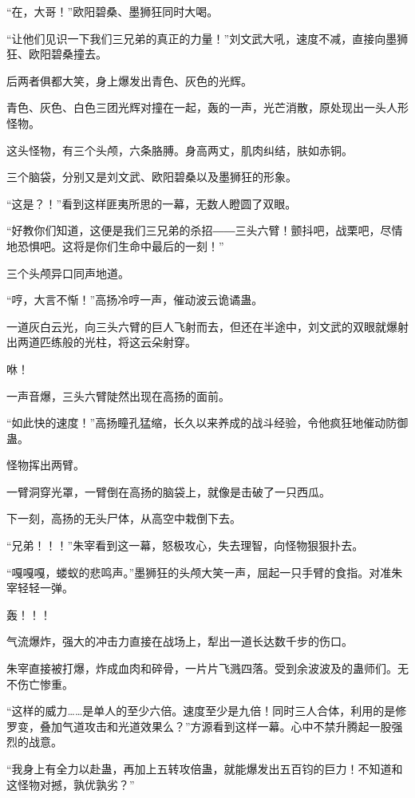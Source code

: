 
\begin{this_body}

“在，大哥！”欧阳碧桑、墨狮狂同时大喝。

“让他们见识一下我们三兄弟的真正的力量！”刘文武大吼，速度不减，直接向墨狮狂、欧阳碧桑撞去。

后两者俱都大笑，身上爆发出青色、灰色的光辉。

青色、灰色、白色三团光辉对撞在一起，轰的一声，光芒消散，原处现出一头人形怪物。

这头怪物，有三个头颅，六条胳膊。身高两丈，肌肉纠结，肤如赤铜。

三个脑袋，分别又是刘文武、欧阳碧桑以及墨狮狂的形象。

“这是？！”看到这样匪夷所思的一幕，无数人瞪圆了双眼。

“好教你们知道，这便是我们三兄弟的杀招――三头六臂！颤抖吧，战栗吧，尽情地恐惧吧。这将是你们生命中最后的一刻！”

三个头颅异口同声地道。

“哼，大言不惭！”高扬冷哼一声，催动波云诡谲蛊。

一道灰白云光，向三头六臂的巨人飞射而去，但还在半途中，刘文武的双眼就爆射出两道匹练般的光柱，将这云朵射穿。

咻！

一声音爆，三头六臂陡然出现在高扬的面前。

“如此快的速度！”高扬瞳孔猛缩，长久以来养成的战斗经验，令他疯狂地催动防御蛊。

怪物挥出两臂。

一臂洞穿光罩，一臂倒在高扬的脑袋上，就像是击破了一只西瓜。

下一刻，高扬的无头尸体，从高空中栽倒下去。

“兄弟！！！”朱宰看到这一幕，怒极攻心，失去理智，向怪物狠狠扑去。

“嘎嘎嘎，蝼蚁的悲鸣声。”墨狮狂的头颅大笑一声，屈起一只手臂的食指。对准朱宰轻轻一弹。

轰！！！

气流爆炸，强大的冲击力直接在战场上，犁出一道长达数千步的伤口。

朱宰直接被打爆，炸成血肉和碎骨，一片片飞溅四落。受到余波波及的蛊师们。无不伤亡惨重。

“这样的威力……是单人的至少六倍。速度至少是九倍！同时三人合体，利用的是修罗变，叠加气道攻击和光道效果么？”方源看到这样一幕。心中不禁升腾起一股强烈的战意。

“我身上有全力以赴蛊，再加上五转攻倍蛊，就能爆发出五百钧的巨力！不知道和这怪物对撼，孰优孰劣？”


\end{this_body}
